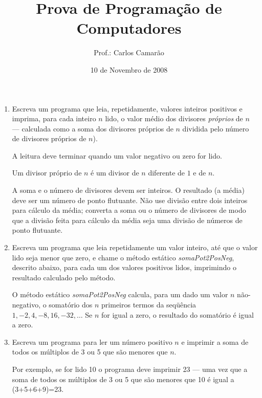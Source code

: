 \documentclass[brazil]{article}
\title{Prova de Programa\c{c}\~ao de Computadores}
\author{Prof.: Carlos Camar\~ao}
\date{10 de Novembro de 2008}
\begin{document}
\maketitle

\begin{enumerate}

\item Escreva um programa que leia, repetidamente, valores inteiros
positivos e imprima, para cada inteiro $n$ lido, o valor m\'edio dos
divisores {\em pr\'oprios\/} de $n$ --- calculada como a soma dos
divisores pr\'oprios de $n$ dividida pelo n\'umero de divisores
pr\'oprios de $n$).

A leitura deve terminar quando um valor negativo ou zero for lido.

Um divisor pr\'oprio de $n$ \'e um divisor de $n$ diferente de $1$ e
de $n$.

A soma e o n\'umero de divisores devem ser inteiros. O resultado (a
m\'edia) deve ser um n\'umero de ponto flutuante. N\~ao use divis\~ao
entre dois inteiros para c\'alculo da m\'edia; converta a soma ou o
n\'umero de divisores de modo que a divis\~ao feita para c\'alculo da
m\'edia seja uma divis\~ao de n\'umeros de ponto flutuante.

\item Escreva um programa que leia repetidamente um valor inteiro,
at\'e que o valor lido seja menor que zero, e chame o m\'etodo
est\'atico {\it somaPot2PosNeg\/}, descrito abaixo, para cada um dos
valores positivos lidos, imprimindo o resultado calculado pelo
m\'etodo.

O m\'etodo est\'atico {\it somaPot2PosNeg\/} calcula, para um dado um
valor $n$ n\~ao-negativo, o somat\'orio dos $n$ primeiros termos da
seq\"u\^encia $1, - 2, 4, - 8, 16, - 32, \ldots$ Se $n$ for igual a
zero, o resultado do somat\'orio \'e igual a zero.

\item Escreva um programa para ler um n\'umero positivo $n$ e imprimir
a soma de todos os m\'ultiplos de 3 ou 5 que s\~ao menores que $n$.

Por exemplo, se for lido 10 o programa deve imprimir 23 --- uma vez
que a soma de todos os m\'ultiplos de 3 ou 5 que s\~ao menores que 10
\'e igual a (3+5+6+9)=23.


\end{enumerate}
\end{document}
